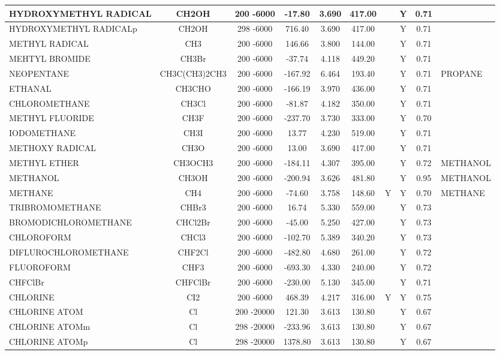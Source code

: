 \begin{longtable}{@{\extracolsep{\fill}}|l|c|c|c|c|c|c|c|c|l|}
HYDROXYMETHYL RADICAL&CH2OH&200 -6000&  -17.80& 3.690&   417.00& &Y& 0.71&\\ \hline
HYDROXYMETHYL RADICALp&CH2OH&298 -6000&  716.40& 3.690&   417.00& &Y& 0.71&\\ \hline
METHYL RADICAL&CH3&200 -6000&  146.66& 3.800&   144.00& &Y& 0.71&\\ \hline
MEHTYL BROMIDE&CH3Br&200 -6000&  -37.74& 4.118&   449.20& &Y& 0.71&\\ \hline
NEOPENTANE&CH3C(CH3)2CH3&200 -6000& -167.92& 6.464&   193.40& &Y& 0.71&PROPANE\\ \hline
ETHANAL&CH3CHO&200 -6000& -166.19& 3.970&   436.00& &Y& 0.71&\\ \hline
CHLOROMETHANE&CH3Cl&200 -6000&  -81.87& 4.182&   350.00& &Y& 0.71&\\ \hline
METHYL FLUORIDE&CH3F&200 -6000& -237.70& 3.730&   333.00& &Y& 0.70&\\ \hline
IODOMETHANE&CH3I&200 -6000&   13.77& 4.230&   519.00& &Y& 0.71&\\ \hline
METHOXY RADICAL&CH3O&200 -6000&   13.00& 3.690&   417.00& &Y& 0.71&\\ \hline
METHYL ETHER&CH3OCH3&200 -6000& -184.11& 4.307&   395.00& &Y& 0.72&METHANOL\\ \hline
METHANOL&CH3OH&200 -6000& -200.94& 3.626&   481.80& &Y& 0.95&METHANOL\\ \hline
METHANE&CH4&200 -6000&  -74.60& 3.758&   148.60&Y&Y& 0.70&METHANE\\ \hline
TRIBROMOMETHANE&CHBr3&200 -6000&   16.74& 5.330&   559.00& &Y& 0.73&\\ \hline
BROMODICHLOROMETHANE&CHCl2Br&200 -6000&  -45.00& 5.250&   427.00& &Y& 0.73&\\ \hline
CHLOROFORM&CHCl3&200 -6000& -102.70& 5.389&   340.20& &Y& 0.73&\\ \hline
DIFLUROCHLOROMETHANE&CHF2Cl&200 -6000& -482.80& 4.680&   261.00& &Y& 0.72&\\ \hline
FLUOROFORM&CHF3&200 -6000& -693.30& 4.330&   240.00& &Y& 0.72&\\ \hline
CHFClBr&CHFClBr&200 -6000& -230.00& 5.130&   345.00& &Y& 0.71&\\ \hline
CHLORINE&CI2&200 -6000&  468.39& 4.217&   316.00&Y&Y& 0.75&\\ \hline
CHLORINE ATOM&Cl&200 -20000&  121.30& 3.613&   130.80& &Y& 0.67&\\ \hline
CHLORINE ATOMm&Cl&298 -20000& -233.96& 3.613&   130.80& &Y& 0.67&\\ \hline
CHLORINE ATOMp&Cl&298 -20000& 1378.80& 3.613&   130.80& &Y& 0.67&\\ \hline

\end{longtable}
